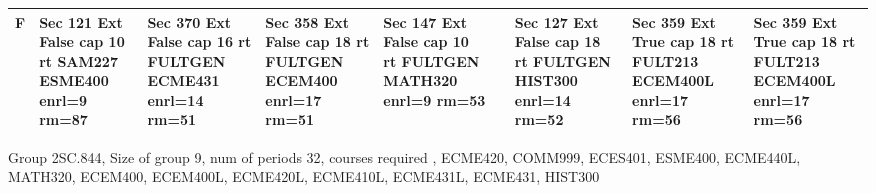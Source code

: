 \documentclass{article} \usepackage[margin=0.5in]{geometry}
\newcommand{\textgr}[1]{\cellcolor{gray!40}\textbf{#1}}
\begin{document}
\begin{tabular}{|c|z|z|z|z|z|z|z|z|}
\hline
\textgr{F} &  Sec 121 Ext False cap 10 rt SAM227 ESME400 enrl=9 rm=87 & Sec 370 Ext False cap 16 rt FULTGEN ECME431 enrl=14 rm=51 & Sec 358 Ext False cap 18 rt FULTGEN ECEM400 enrl=17 rm=51 & Sec 147 Ext False cap 10 rt FULTGEN MATH320 enrl=9 rm=53 &  & Sec 127 Ext False cap 18 rt FULTGEN HIST300 enrl=14 rm=52 & Sec 359 Ext True cap 18 rt FULT213 ECEM400L enrl=17 rm=56 & Sec 359 Ext True cap 18 rt FULT213 ECEM400L enrl=17 rm=56 \\[65pt]
\hline
\end{tabular}

	
Group 2SC.844, Size of group  9, num of periods 32, courses required , ECME420, COMM999, ECES401, ESME400, ECME440L, MATH320, ECEM400, ECEM400L, ECME420L, ECME410L, ECME431L, ECME431, HIST300 
\newpage
	
\end{document}
